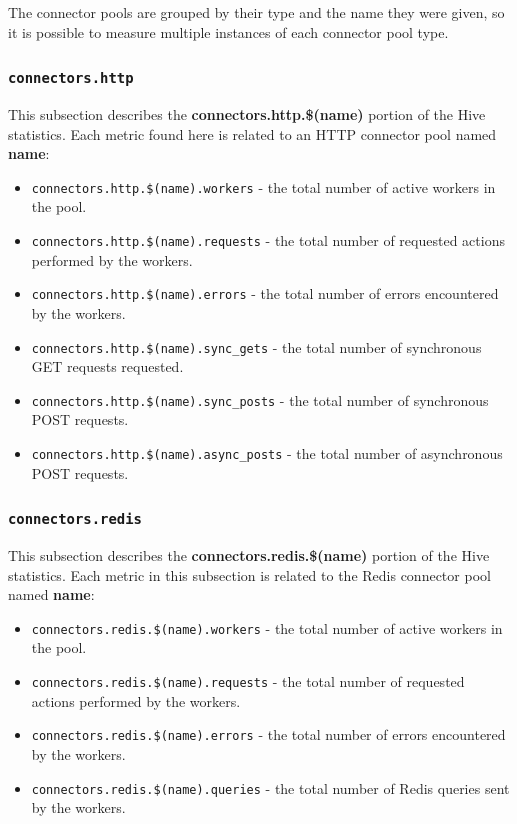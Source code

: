 \documentclass[a4paper]{article}
\begin{document}
\noindent
The connector pools are grouped by their type and the name they were given, so it is possible to measure multiple instances of each connector pool type.
\subsubsection{\texttt{connectors.http}}
\label{sec-4-2-11}

This subsection describes the \textbf{connectors.http.\$(name)} portion of the Hive statistics. Each metric found here is related to an HTTP connector pool named \textbf{name}:


\begin{itemize}
\item \texttt{connectors.http.\$(name).workers} - the total number of active workers in the pool.
\item \texttt{connectors.http.\$(name).requests} - the total number of requested actions performed by the workers.
\item \texttt{connectors.http.\$(name).errors} - the total number of errors encountered by the workers.
\item \texttt{connectors.http.\$(name).sync\_gets} - the total number of synchronous GET requests requested.
\item \texttt{connectors.http.\$(name).sync\_posts} - the total number of synchronous POST requests.
\item \texttt{connectors.http.\$(name).async\_posts} - the total number of asynchronous POST requests.
\end{itemize}
\subsubsection{\texttt{connectors.redis}}
\label{sec-4-2-12}

This subsection describes the \textbf{connectors.redis.\$(name)} portion of the Hive statistics. Each metric in this subsection is related to the Redis connector pool named \textbf{name}:


\begin{itemize}
\item \texttt{connectors.redis.\$(name).workers} - the total number of active workers in the pool.
\item \texttt{connectors.redis.\$(name).requests} - the total number of requested actions performed by the workers.
\item \texttt{connectors.redis.\$(name).errors} - the total number of errors encountered by the workers.
\item \texttt{connectors.redis.\$(name).queries} - the total number of Redis queries sent by the workers.
\end{itemize}
\end{document}
